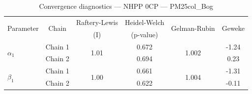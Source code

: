 \begin{table}[H]
\centering
\caption{Convergence diagnostics — NHPP 0CP — PM25col_Bog}
\begin{tabular}{lccccc}
\toprule
\multirow{2}{*}{Parameter} & \multirow{2}{*}{Chain} & Raftery-Lewis & Heidel-Welch & \multirow{2}{*}{Gelman-Rubin} & \multirow{2}{*}{Geweke} \\
 & & (I) & (p-value) & & (z) \\
\midrule
\multirow{2}{*}{$\alpha_1$} & Chain 1 & \multirow{2}{*}{1.01} & 0.672 & \multirow{2}{*}{1.002} & -1.24 \\
 & Chain 2 & & 0.694 & & 0.23 \\
\midrule
\multirow{2}{*}{$\beta_1$} & Chain 1 & \multirow{2}{*}{1.00} & 0.661 & \multirow{2}{*}{1.004} & -1.31 \\
 & Chain 2 & & 0.622 & & -0.11 \\
\bottomrule
\end{tabular}
\end{table}
